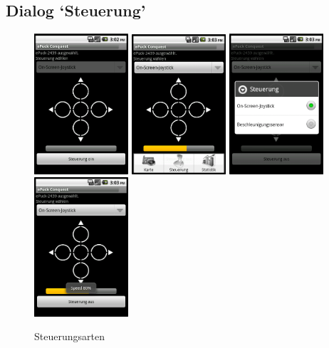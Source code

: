 \documentclass[10pt,a4paper]{article}
\begin{document}
			\subsection{Dialog `Steuerung'}
			
			\begin{figure}[h]
				  \centering
				\includegraphics[width=3.5cm]{images/control.png}
				\includegraphics[width=3.5cm]{images/control_menu.png}
				\includegraphics[width=3.5cm]{images/control_spinner.png}
				\includegraphics[width=3.5cm]{images/control_speed.png}				
  				\caption{Steuerungsarten}
  			\end{figure}	
			
\end{document}
